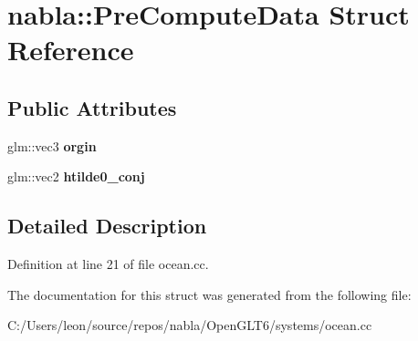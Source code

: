\hypertarget{structnabla_1_1_pre_compute_data}{}\section{nabla\+::Pre\+Compute\+Data Struct Reference}
\label{structnabla_1_1_pre_compute_data}
\subsection*{Public Attributes}
\begin{DoxyCompactItemize}
\item 
\mbox{\label{structnabla_1_1_pre_compute_data_afbef33855941e03b702dca906ad242fa}} 
glm\+::vec3 {\bfseries orgin}
\item 
\mbox{\label{structnabla_1_1_pre_compute_data_ab5a21249a68250fe0d1d228c3e71224a}} 
glm\+::vec2 {\bfseries htilde0\+\_\+conj}
\end{DoxyCompactItemize}


\subsection{Detailed Description}


Definition at line 21 of file ocean.\+cc.



The documentation for this struct was generated from the following file\+:\begin{DoxyCompactItemize}
\item 
C\+:/\+Users/leon/source/repos/nabla/\+Open\+G\+L\+T6/systems/ocean.\+cc\end{DoxyCompactItemize}
